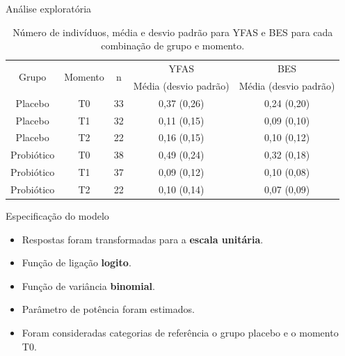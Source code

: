 \documentclass[
  ignorenonframetext,
  serif,
  professionalfont,
  usenames,
  dvipsnames,
  aspectratio = 169]{beamer}
\begin{document}
\begin{frame}{Análise exploratória}
\protect\hypertarget{anuxe1lise-exploratuxf3ria-1}{}
\begin{table}[H]
\centering
\begin{tabular}{ccccc}
\hline
\multirow{2}{*}{Grupo} & \multirow{2}{*}{Momento} & \multirow{2}{*}{n} & YFAS                  & BES                   \\ \cline{4-5} 
                       &                          &                    & Média (desvio padrão) & Média (desvio padrão) \\ \hline
Placebo                & T0                       & 33                 & 0,37 (0,26)           & 0,24 (0,20)           \\
Placebo                & T1                       & 32                 & 0,11 (0,15)           & 0,09 (0,10)           \\
Placebo                & T2                       & 22                 & 0,16 (0,15)           & 0,10 (0,12)           \\
Probiótico             & T0                       & 38                 & 0,49 (0,24)           & 0,32 (0,18)           \\
Probiótico             & T1                       & 37                 & 0,09 (0,12)           & 0,10 (0,08)           \\
Probiótico             & T2                       & 22                 & 0,10 (0,14)           & 0,07 (0,09)           \\ \hline
\end{tabular}
\caption{Número de indivíduos, média e desvio padrão para YFAS e BES para cada combinação de grupo e momento.}
\label{tab:descritiva1}
\end{table}
\end{frame}

\begin{frame}{Especificação do modelo}
\protect\hypertarget{especificauxe7uxe3o-do-modelo}{}
\begin{itemize}
  \itemsep 2ex
  
  \item Respostas foram transformadas para a \textbf{escala unitária}. 

  \item Função de ligação \textbf{logito}.

  \item Função de variância \textbf{binomial}. 

  \item Parâmetro de potência foram estimados.

  \item Foram consideradas categorias de referência o grupo placebo e o momento T0.

\end{itemize}
\end{frame}
\end{document}
